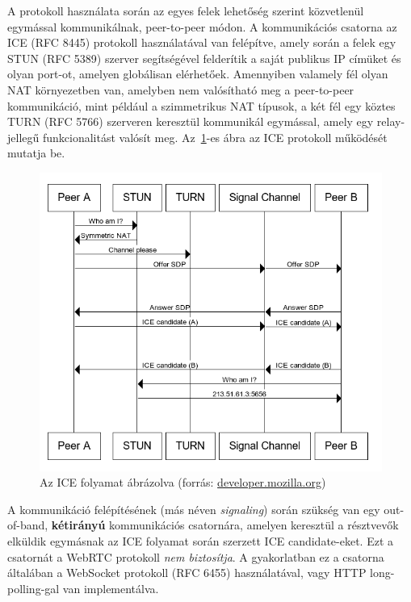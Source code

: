 A protokoll használata során az egyes felek lehetőség szerint közvetlenül egymással kommunikálnak, peer-to-peer módon.
A kommunikációs csatorna az ICE (RFC 8445\cite{ICE}) protokoll használatával van felépítve, amely során a felek egy STUN (RFC 5389)
szerver segítségével felderítik a saját publikus IP címüket és olyan port-ot, amelyen globálisan elérhetőek.
Amennyiben valamely fél olyan NAT környezetben van, amelyben nem valósítható meg a peer-to-peer kommunikáció, mint például
a szimmetrikus NAT típusok, a két fél egy köztes TURN (RFC 5766\cite{TURN}) szerveren keresztül kommunikál egymással, amely egy
relay-jellegű funkcionalitást valósít meg.
Az~\ref{fig:ice}-es ábra az ICE protokoll működését mutatja be.

\begin{figure}[!ht]
    \centering
    \includegraphics[width=150mm, keepaspectratio]{figures/ice}
    \caption{Az ICE folyamat ábrázolva (forrás: \href{https://developer.mozilla.org/en-US/docs/Web/API/WebRTC_API/Connectivity}{developer.mozilla.org})}
    \label{fig:ice}
\end{figure}

A kommunikáció felépítésének (más néven \emph{signaling}) során szükség van egy out-of-band, \textbf{kétirányú}
kommunikációs csatornára, amelyen keresztül a résztvevők elküldik egymásnak az ICE folyamat során szerzett ICE candidate-eket.
Ezt a csatornát a WebRTC protokoll \emph{nem biztosítja}.
A gyakorlatban ez a csatorna általában a WebSocket protokoll (RFC 6455\cite{WebSocket}) használatával, vagy HTTP long-polling-gal van
implementálva.

